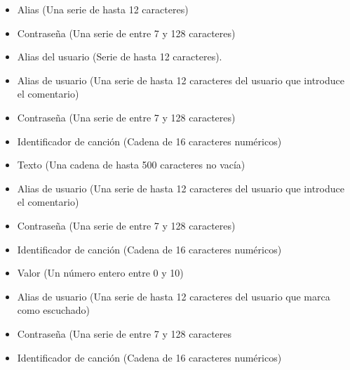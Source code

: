 \begin{itemize}
\item Alias (Una serie de hasta 12 caracteres)
\item Contraseña (Una serie de entre 7 y 128 caracteres)
\end{itemize}

\begin{itemize}
\item Alias del usuario (Serie de hasta 12 caracteres).
\end{itemize}


\begin{itemize}
\item Alias de usuario (Una serie de hasta 12 caracteres del usuario que introduce el comentario)
\item Contraseña (Una serie de entre 7 y 128 caracteres)
\item Identificador de canción (Cadena de 16 caracteres numéricos)
\item Texto (Una cadena de hasta 500 caracteres no vacía)
\end{itemize}

\begin{itemize}
\item Alias de usuario (Una serie de hasta 12 caracteres del usuario que introduce el comentario)
\item Contraseña (Una serie de entre 7 y 128 caracteres)
\item Identificador de canción (Cadena de 16 caracteres numéricos)
\item Valor (Un número entero entre 0 y 10)
\end{itemize}

\begin{itemize}
\item Alias de usuario (Una serie de hasta 12 caracteres del usuario que marca como escuchado)
\item Contraseña (Una serie de entre 7 y 128 caracteres
\item Identificador de canción (Cadena de 16 caracteres numéricos)
\end{itemize}

